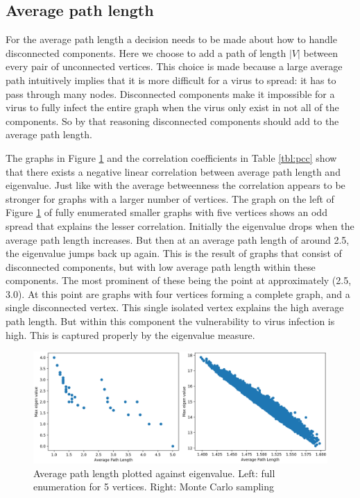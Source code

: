 \documentclass[11pt]{article}
\theoremstyle{definition}
\begin{document}
\subsection{Average path length}

For the average path length a decision needs to be made about how to handle disconnected components. Here we choose to add a path of length $|V|$ between every pair of unconnected vertices. This choice is made because a large average path intuitively implies that it is more difficult for a virus to spread: it has to pass through many nodes. Disconnected components make it impossible for a virus to fully infect the entire graph when the virus only exist in not all of the components. So by that reasoning disconnected components should add to the average path length.

The graphs in Figure \ref{fig:measure_apl} and the correlation coefficients in Table \ref{tbl:pcc} show that there exists a negative linear correlation between average path length and eigenvalue. Just like with the average betweenness the correlation appears to be stronger for graphs with a larger number of vertices. The graph on the left of Figure \ref{fig:measure_apl} of fully enumerated smaller graphs with five vertices shows an odd spread that explains the lesser correlation. Initially the eigenvalue drops when the average path length increases. But then at an average path length of around 2.5, the eigenvalue jumps back up again. This is the result of graphs that consist of disconnected components, but with low average path length within these components. The most prominent of these being the point at approximately (2.5, 3.0). At this point are graphs with four vertices forming a complete graph, and a single disconnected vertex. This single isolated vertex explains the high average path length. But within this component the vulnerability to virus infection is high. This is captured properly by the eigenvalue measure.


\begin{figure}[h!]
  \centering
    \includegraphics[width=1\textwidth]{results_graph_measures/Average_Path_Length_c}

  \caption{Average path length plotted against eigenvalue. Left: full enumeration for 5 vertices. Right: Monte Carlo sampling}
  \label{fig:measure_apl}
\end{figure}
\end{document}
